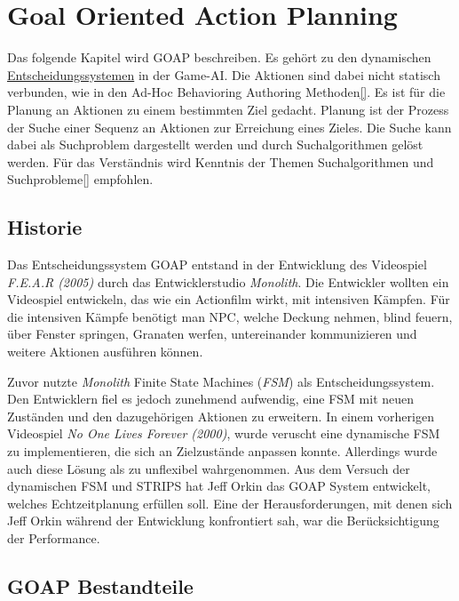 \chapter{Goal Oriented Action Planning}
\label{chap:goap}

Das folgende Kapitel wird GOAP beschreiben. Es geh\"{o}rt zu den dynamischen \hyperref[chap:entscheidungssysteme]{Entscheidungssystemen} in der Game-AI. Die Aktionen sind dabei nicht statisch verbunden, wie in den Ad-Hoc Behavioring Authoring Methoden\ref{}. Es ist f\"{u}r die Planung an Aktionen zu einem bestimmten Ziel gedacht. Planung ist der Prozess der Suche einer Sequenz an Aktionen zur Erreichung eines Zieles. Die Suche kann dabei als Suchproblem dargestellt werden und durch Suchalgorithmen gel\"{o}st werden. F\"{u}r das Verst\"{a}ndnis wird Kenntnis der Themen Suchalgorithmen und Suchprobleme\ref{} empfohlen.

\section{Historie}
\label{chap:goap historie}

Das Entscheidungssystem GOAP entstand in der Entwicklung des Videospiel \textit{F.E.A.R (2005)} durch das Entwicklerstudio \textit{Monolith}. Die Entwickler wollten ein Videospiel entwickeln, das wie ein Actionfilm wirkt, mit intensiven K\"{a}mpfen. F\"{u}r die intensiven K\"{a}mpfe ben\"{o}tigt man NPC, welche Deckung nehmen, blind feuern, \"{u}ber Fenster springen, Granaten werfen, untereinander kommunizieren und weitere Aktionen ausf\"{u}hren k\"{o}nnen.\autocite{}

Zuvor nutzte \textit{Monolith} Finite State Machines (\textit{FSM}) als Entscheidungssystem. Den Entwicklern fiel es jedoch zunehmend aufwendig, eine FSM mit neuen Zust\"{a}nden und den dazugeh\"{o}rigen Aktionen zu erweitern. In einem vorherigen Videospiel \textit{No One Lives Forever (2000)}, wurde veruscht eine dynamische FSM zu implementieren, die sich an Zielzust\"{a}nde anpassen konnte. Allerdings wurde auch diese L\"{o}sung als zu unflexibel wahrgenommen. Aus dem Versuch der dynamischen FSM und STRIPS hat Jeff Orkin das GOAP System entwickelt, welches Echtzeitplanung erf\"{u}llen soll. Eine der Herausforderungen, mit denen sich Jeff Orkin w\"{a}hrend der Entwicklung konfrontiert sah, war die Ber\"{u}cksichtigung der Performance.\autocite{retro_fear}



\section{GOAP Bestandteile}
\label{chap:goap bestandteile}

